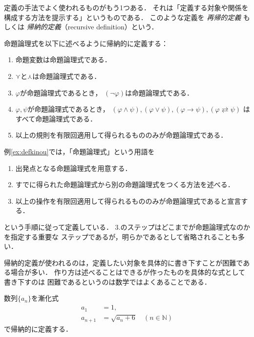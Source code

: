   定義の手法でよく使われるものがもう1つある．
  それは「定義する対象や関係を構成する方法を提示する」というものである．
  このような定義を %
  \emph{再帰的定義} もしくは
  \emph{帰納的定義}（recursive definition）という．
  \begin{ex} \label{ex:defkinou}
    命題論理式を以下に述べるように帰納的に定義する：
    \begin{enumerate}[(1) ]
      \item 命題変数は命題論理式である．
      \item $\curlyvee$と$\curlywedge$は命題論理式である．
      \item $\varphi$が命題論理式であるとき，
        $(\lnot \varphi)$は命題論理式である．
      \item $\varphi , \psi$が命題論理式であるとき，
        $(\varphi \land \psi) , (\varphi \lor \psi) 
        , (\varphi \to \psi) , 
        (\varphi \rightleftarrows \psi)$
        はすべて命題論理式である．
      \item 以上の規則を有限回適用して得られるもののみが命題論理式である．
    \end{enumerate}
  \end{ex}

  例\ref{ex:defkinou}では，「命題論理式」という用語を
  \begin{enumerate}[1. ]
    \item 出発点となる命題論理式を用意する．
    \item すでに得られた命題論理式から別の命題論理式をつくる方法を述べる．
    \item 以上の操作を有限回適用して得られるもののみが命題論理式であると宣言する．
  \end{enumerate}
  という手順に従って定義している．
  3.のステップはどこまでが命題論理式なのかを指定する重要な
  ステップであるが，明らかであるとして省略されることも多い．

  帰納的定義が使われるのは，定義したい対象を具体的に書き下すことが困難である場合が多い．
  作り方は述べることはできるが作ったものを具体的な式として書き下すのは
  困難であるというのは数学ではよくあることである．

  \begin{ex} \label{ex:zenkasiki}
    数列$\{ a_n \}$を漸化式
    \begin{align*}
      a_1 & = 1, \\
      a_{n+1} & = \sqrt{ a_n + 6} \quad ( n \in \mathbb{N} ) 
    \end{align*}
    で帰納的に定義する．
  \end{ex}

